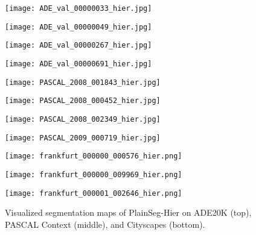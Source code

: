 \documentclass{article} \usepackage{iclr2024_conference,times}
\begin{document}
\begin{figure}
\centering
\begin{minipage}{1.3in}
\texttt{[image: ADE\_val\_00000033\_hier.jpg]}
\end{minipage}
\begin{minipage}{1.3in}
\texttt{[image: ADE\_val\_00000049\_hier.jpg]}
\end{minipage}
\begin{minipage}{1.3in}
\texttt{[image: ADE\_val\_00000267\_hier.jpg]}
\end{minipage}
\vspace{0.3em}
\begin{minipage}{1.3in}
\texttt{[image: ADE\_val\_00000691\_hier.jpg]}
\end{minipage}
\begin{minipage}{1.3in}
\texttt{[image: PASCAL\_2008\_001843\_hier.jpg]}
\end{minipage}
\begin{minipage}{1.3in}
\texttt{[image: PASCAL\_2008\_000452\_hier.jpg]}
\end{minipage}
\begin{minipage}{1.3in}
\texttt{[image: PASCAL\_2008\_002349\_hier.jpg]}
\end{minipage}
\vspace{0.3em}
\begin{minipage}{1.3in}
\texttt{[image: PASCAL\_2009\_000719\_hier.jpg]}
\end{minipage}
\begin{minipage}{1.75in}
\texttt{[image: frankfurt\_000000\_000576\_hier.png]}
\end{minipage}
\begin{minipage}{1.75in}
\texttt{[image: frankfurt\_000000\_009969\_hier.png]}
\end{minipage}
\begin{minipage}{1.75in}
\texttt{[image: frankfurt\_000001\_002646\_hier.png]}
\end{minipage}
\caption{Visualized segmentation maps of PlainSeg-Hier on ADE20K (top), PASCAL Context (middle), and Cityscapes (bottom).}
\label{fig8}
\end{figure}
\end{document}

